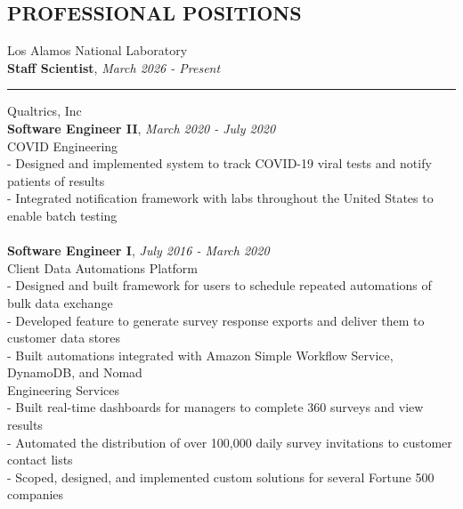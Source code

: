 \documentclass[margin,line]{res}
\begin{document}
\begin{resume}
\section{\bf PROFESSIONAL POSITIONS}
{\sc Los Alamos National Laboratory} \vspace{0.2cm} \\
{\bf Staff Scientist}, {\it March 2026 - Present} \vspace{0.1cm} \\
\noindent\rule{\textwidth}{0.5pt}
{\sc Qualtrics, Inc} \vspace{0.2cm} \\
{\bf Software Engineer II}, {\it March 2020 - July 2020} \vspace{0.1cm} \\
{\sc COVID Engineering} \\
- Designed and implemented system to track COVID-19 viral tests and notify patients of results \vspace{0.05cm} \\
- Integrated notification framework with labs throughout the United States to enable batch testing \vspace{0.05cm} \\
\vspace{0.1cm}
\dotfill \\
\vspace{0.1cm}
{\bf Software Engineer I}, {\it July 2016 - March 2020} \vspace{0.1cm} \\
{\sc Client Data Automations Platform} \\
- Designed and built framework for users to schedule repeated automations of bulk data exchange \vspace{0.05cm} \\
- Developed feature to generate survey response exports and deliver them to customer data stores \vspace{0.05cm} \\
- Built automations integrated with Amazon Simple Workflow Service, DynamoDB, and Nomad \vspace{0.2cm} \vspace{0.05cm} \\
{\sc Engineering Services} \vspace{0.05cm} \\
- Built real-time dashboards for managers to complete 360 surveys and view results \vspace{0.05cm} \\
- Automated the distribution of over 100,000 daily survey invitations to customer contact lists \vspace{0.05cm} \\
- Scoped, designed, and implemented custom solutions for several Fortune 500 companies


\end{resume}
\end{document}
